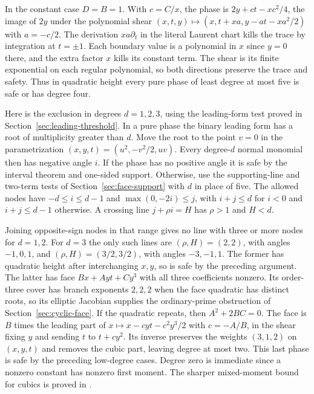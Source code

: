 In the constant case \(D=B=1\). With \(c=C/x\), the phase is
\(2y+ct-xc^2/4\), the image of \(2y\) under the polynomial shear
\((x,t,y)\mapsto(x,t+xa,y-at-xa^2/2)\) with \(a=-c/2\).
The derivation \(xa\partial_t\) in the literal Laurent chart kills the
trace by integration at \(t=\pm1\). Each boundary value is a polynomial
in \(x\) since \(y=0\) there, and the extra factor \(x\) kills its constant
term. The shear is its finite exponential on each regular polynomial,
so both directions preserve the trace and safety. Thus in quadratic
height every pure phase of least degree at most five is safe or has
degree four.

Here is the exclusion in degrees \(d=1,2,3\), using the leading-form
test proved in Section~\ref{sec:leading-threshold}. In a pure phase the
binary leading form has a root of multiplicity greater than \(d\).
Move the root to the point \(v=0\) in the parametrization
\((x,y,t)=(u^2,-v^2/2,uv)\). Every degree-\(d\) normal monomial then
has negative angle \(i\). If the phase has no positive angle it is
safe by the interval theorem and one-sided support. Otherwise, use the
supporting-line and two-term tests of Section~\ref{sec:face-support} with
\(d\) in place of five. The allowed nodes have \(-d\le i\le d-1\) and
\(\max(0,-2i)\le j\), with \(i+j\le d\) for \(i<0\) and
\(i+j\le d-1\) otherwise. A crossing line \(j+\rho i=H\) has
\(\rho>1\) and \(H<d\).

Joining opposite-sign nodes in that range gives no line with three
or more nodes for \(d=1,2\). For \(d=3\) the only such lines are
\((\rho,H)=(2,2)\), with angles \(-1,0,1\), and
\((\rho,H)=(3/2,3/2)\), with angles \(-3,-1,1\). The former has
quadratic height after interchanging \(x,y\), so is safe by the
preceding argument. The latter has face \(Bx+Ayt+Cy^3\) with all
three coefficients nonzero. Its order-three cover has branch
exponents \(2,2,2\) when the face quadratic has distinct roots, so its
elliptic Jacobian supplies the ordinary-prime obstruction of
Section~\ref{sec:cyclic-face}. If the quadratic repeats, then
\(A^2+2BC=0\). The face is \(B\) times the leading part of
\(x\mapsto x-cyt-c^2y^3/2\) with \(c=-A/B\), in the shear fixing
\(y\) and sending \(t\) to \(t+cy^2\). Its inverse preserves the weights
\((3,1,2)\) on \((x,y,t)\) and removes the cubic part, leaving
degree at most two. This last phase is safe by the preceding
low-degree cases. Degree zero is immediate since a nonzero constant
has nonzero first moment. The sharper mixed-moment bound for cubics
is proved in \cite{cubicsphere}.


